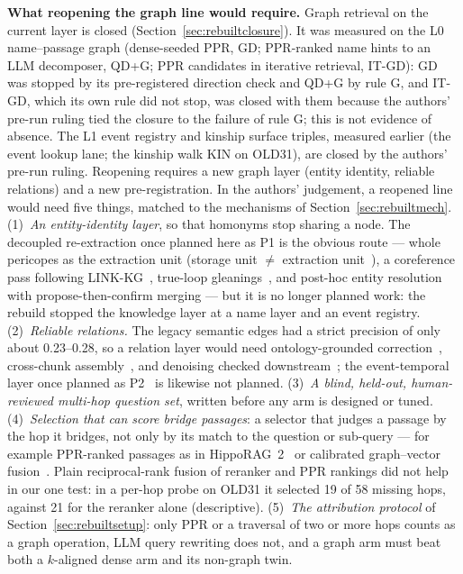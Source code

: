 \textbf{What reopening the graph line would require.} Graph retrieval
on the current layer is closed (Section~\ref{sec:rebuiltclosure}). It
was measured on the L0 name--passage graph (dense-seeded PPR, GD;
PPR-ranked name hints to an LLM decomposer, QD+G; PPR candidates in
iterative retrieval, IT-GD): GD was stopped by its pre-registered
direction check and QD+G by rule G, and IT-GD, which its own rule did
not stop, was closed with them because the authors' pre-run ruling tied
the closure to the failure of rule G; this is not evidence of absence.
The L1 event registry and kinship surface triples, measured earlier
(the event lookup lane; the kinship walk KIN on OLD31), are closed by
the authors' pre-run ruling. Reopening requires a new graph layer
(\eg entity identity, reliable relations) and a new
pre-registration. In the authors' judgement, a reopened line would
need five things, matched to the mechanisms of
Section~\ref{sec:rebuiltmech}.
(1)~\emph{An entity-identity layer}, so that homonyms stop sharing a
node. The decoupled re-extraction once planned here as P1 is the
obvious route --- whole pericopes as the extraction unit (storage unit
$\ne$ extraction unit~\cite{neo4jbuilder}), a coreference pass
following LINK-KG~\cite{meher2025linkkg}, true-loop
gleanings~\cite{edge2024graphrag,nanographrag}, and post-hoc entity
resolution with propose-then-confirm merging --- but it is no longer
planned work: the rebuild stopped the knowledge layer at a name layer
and an event registry.
(2)~\emph{Reliable relations.} The legacy semantic edges had a strict
precision of only about 0.23--0.28, so a relation layer would need
ontology-grounded correction~\cite{loconte2026betterlater,zhang2024edc},
cross-chunk assembly~\cite{zhang2025rakg,zhang2026crossaug}, and
denoising checked downstream~\cite{zheng2025lessismore}; the
event-temporal layer once planned as
P2~\cite{lairgi2025atom,zhang2025entityevent,sun2025dygrag} is likewise
not planned.
(3)~\emph{A blind, held-out, human-reviewed multi-hop question set},
written before any arm is designed or tuned.
(4)~\emph{Selection that can score bridge passages}: a selector that
judges a passage by the hop it bridges, not only by its match to the
question or sub-query --- for example PPR-ranked passages as in
HippoRAG~2~\cite{gutierrez2025hipporag2} or calibrated graph--vector
fusion~\cite{bacellar2026calibrated}. Plain reciprocal-rank fusion of
reranker and PPR rankings did not help in our one test: in a per-hop
probe on OLD31 it
selected 19 of 58 missing hops, against 21 for the reranker alone
(descriptive).
(5)~\emph{The attribution protocol} of Section~\ref{sec:rebuiltsetup}:
only PPR or a traversal of two or more hops counts as a graph
operation, LLM query rewriting does not, and a graph arm must beat both
a $k$-aligned dense arm and its non-graph twin.


